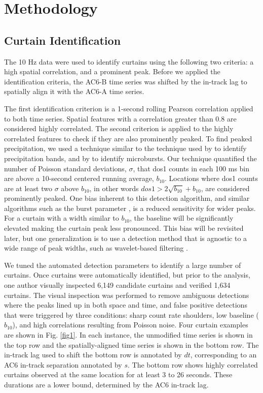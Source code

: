 \documentclass[draft]{agujournal2019}
\begin{document}
\section{Methodology} 
\subsection{Curtain Identification} \label{curtain_identification}
The 10 Hz data were used to identify curtains using the following two criteria: a high spatial correlation, and a prominent peak. Before we applied the identification criteria, the AC6-B time series was shifted by the in-track lag to spatially align it with the AC6-A time series. 

The first identification criterion is a 1-second rolling Pearson correlation applied to both time series. Spatial features with a correlation greater than 0.8 are considered highly correlated. The second criterion is applied to the highly correlated features to check if they are also prominently peaked. To find peaked precipitation, we used a technique similar to the technique used by  to identify precipitation bands, and by  to identify microbursts. Our technique quantified the number of Poisson standard deviations, $\sigma$, that dos1 counts in each 100 ms bin are above a 10-second centered running average, $b_{10}$. Locations where dos1 counts are at least two $\sigma$ above $b_{10}$, in other words $dos1 > 2\sqrt{b_{10}} + b_{10}$, are considered prominently peaked. One bias inherent to this detection algorithm, and similar algorithms such as the burst parameter \cite{O'Brien2003}, is a reduced sensitivity for wider peaks. For a curtain with a width similar to $b_{10}$, the baseline will be significantly elevated making the curtain peak less pronounced. This bias will be revisited later, but one generalization is to use a detection method that is agnostic to a wide range of peak widths, such as wavelet-based filtering \cite{Torrence1998}.

We tuned the automated detection parameters to identify a large number of curtains. Once curtains were automatically identified, but prior to the analysis, one author visually inspected 6,149 candidate curtains and verified 1,634 curtains. The visual inspection was performed to remove ambiguous detections where the peaks lined up in both space and time, and false positive detections that were triggered by three conditions: sharp count rate shoulders, low baseline ($b_{10}$), and high correlations resulting from Poisson noise. Four curtain examples are shown in Fig. \ref{fig1}. In each instance, the unmodified time series is shown in the top row and the spatially-aligned time series is shown in the bottom row. The in-track lag used to shift the bottom row is annotated by $dt$, corresponding to an AC6 in-track separation annotated by $s$. The bottom row shows highly correlated curtains observed at the same location for at least 3 to 26 seconds. These durations are a lower bound, determined by the AC6 in-track lag.
\end{document}
